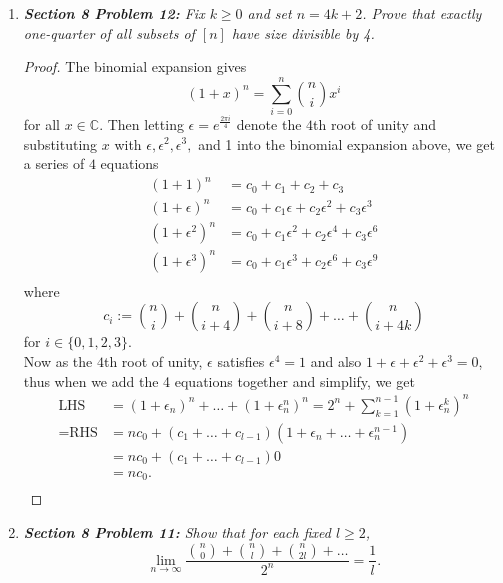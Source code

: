 \documentclass{article}
\begin{document}
\begin{enumerate}[label={\bf Q\arabic*:}]
  \item \it \textbf{Section 8 Problem 12:} Fix $k\geq0$ and set $n=4k+2$.
    Prove that exactly one-quarter of all subsets of $[n]$ have size
    divisible by 4.

    \begin{proof}
      The binomial expansion gives
      \[(1+x)^n =\sum_{i=0}^n\binom{n}{i}x^i\]
      for all $x\in\mathbb{C}$. Then letting $\epsilon=e^{\frac{2\pi
      i}{4}}$ denote the $4$th root of unity and substituting $x$ with
      $\epsilon,\epsilon^2,\epsilon^3,$ and 1 into the binomial expansion
      above, we get a series of $4$ equations
      \begin{align*}
        (1+1)^n         &=c_0+c_1+c_2+c_3\\
        (1+\epsilon)^n   &=c_0+c_1\epsilon  +c_2\epsilon^2
          +c_3\epsilon^3\\
        (1+\epsilon^2)^n &=c_0+c_1\epsilon^2+c_2\epsilon^4
          +c_3\epsilon^6\\
        (1+\epsilon^3)^n &=c_0+c_1\epsilon^3+c_2\epsilon^6
          +c_3\epsilon^9\\
      \end{align*}
      where
      \[c_i :=\binom{n}{i}+\binom{n}{i+4}+\binom{n}{i+8}+
      \ldots+\binom{n}{i+4k}\]
      for $i\in\{0,1,2,3\}$. \\

      Now as the $4$th root of unity, $\epsilon$ satisfies
      $\epsilon^4=1$ and also $1+\epsilon+\epsilon^2+\epsilon^{3}=0$,
      thus when we add the 4 equations together and simplify, we get
      \begin{align*}
        \text{LHS} &=(1+\epsilon_n)^n+\ldots+(1+\epsilon_n^n)^n
          =2^n+\sum_{k=1}^{n-1}(1+\epsilon_n^k)^n\\
        =\text{RHS} &=nc_0
          +(c_1+\ldots+c_{l-1})(1+\epsilon_n+\ldots+\epsilon_n^{n-1})\\
        &=nc_0 +(c_1+\ldots+c_{l-1})0\\
        &=nc_0.\\
      \end{align*}
    \end{proof}

  \item \it \textbf{Section 8 Problem 11:} Show that for each fixed
    $l\geq2$,
    \[\lim_{n\rightarrow\infty}
    \frac{\binom{n}{0}+\binom{n}{l}+\binom{n}{2l}+\ldots}{2^n}
    =\frac{1}{l}.\]


\end{enumerate}
\end{document}

